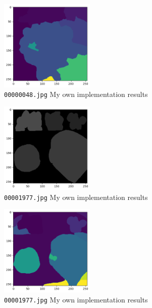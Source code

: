 \documentclass[conference]{IEEEtran}
\begin{document}
 	 \begin{figure}[htbp]
 		\centerline{\includegraphics[width = 0.4\textwidth]{label.png}}

 		\caption{\texttt{00000048.jpg} My own implementation results}
 		\label{fig:segmented}
 	\end{figure}
 	
 	 \begin{figure}[htbp]
 		\centerline{\includegraphics[width = 0.4\textwidth]{bad-ground-truth.png}}
 		\caption{ \texttt{00001977.jpg} My own implementation results}
 		\label{fig:badgroundtruth}
 	\end{figure}
 	
 	\begin{figure}[htbp]
 		\centerline{\includegraphics[width = 0.4\textwidth]{badlabel.png}}
 		\caption{\texttt{00001977.jpg}  My own implementation results}
 		\label{fig:badsegmented}
 	\end{figure}
 	
 	
 	
\end{document}

